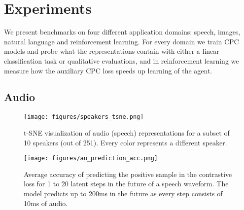 \section{Experiments}
\label{experiments}

We present benchmarks on four different application domains: speech, images, natural language and reinforcement learning. For every domain we train CPC models and probe what the representations contain with either a linear classification task or qualitative evaluations, and in reinforcement learning we measure how the auxiliary CPC loss speeds up learning of the agent.

\subsection{Audio}
\label{audio_exp}

\begin{figure}[t]

\begin{minipage}{0.47\textwidth}
  \centering
  \texttt{[image: figures/speakers\_tsne.png]}
  \caption{t-SNE visualization of audio (speech) representations for a subset of 10 speakers (out of 251). Every color represents a different speaker.}
  \label{speaker_tsne}
\end{minipage}\hfill
\begin{minipage}{0.47\textwidth}
  \centering
  \texttt{[image: figures/au\_prediction\_acc.png]}
  \caption{Average accuracy of predicting the positive sample in the contrastive loss for 1 to 20 latent steps in the future of a speech waveform. The model predicts up to 200ms in the future as every step consists of 10ms of audio.}
  \label{pred_acc}
\end{minipage}
\hfill
\end{figure}

